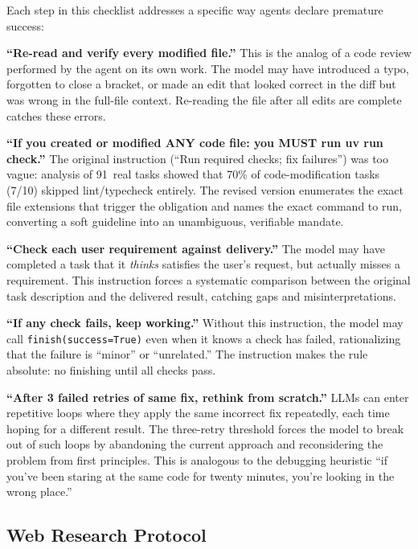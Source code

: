 \documentclass{article}
\begin{document}
\noindent Each step in this checklist addresses a specific way agents declare premature success:

\textbf{``Re-read and verify every modified file.''}  This is the analog of a code review performed by the agent on its own work.  The model may have introduced a typo, forgotten to close a bracket, or made an edit that looked correct in the diff but was wrong in the full-file context.  Re-reading the file after all edits are complete catches these errors.

\textbf{``If you created or modified ANY code file: you MUST run uv run check.''}  The original instruction (``Run required checks; fix failures'') was too vague: analysis of 91~real tasks showed that 70\% of code-modification tasks (7/10) skipped lint/typecheck entirely.  The revised version enumerates the exact file extensions that trigger the obligation and names the exact command to run, converting a soft guideline into an unambiguous, verifiable mandate.

\textbf{``Check each user requirement against delivery.''}  The model may have completed a task that it \emph{thinks} satisfies the user's request, but actually misses a requirement.  This instruction forces a systematic comparison between the original task description and the delivered result, catching gaps and misinterpretations.

\textbf{``If any check fails, keep working.''}  Without this instruction, the model may call \texttt{finish(success=True)} even when it knows a check has failed, rationalizing that the failure is ``minor'' or ``unrelated.''  The instruction makes the rule absolute: no finishing until all checks pass.

\textbf{``After 3 failed retries of same fix, rethink from scratch.''}  LLMs can enter repetitive loops where they apply the same incorrect fix repeatedly, each time hoping for a different result.  The three-retry threshold forces the model to break out of such loops by abandoning the current approach and reconsidering the problem from first principles.  This is analogous to the debugging heuristic ``if you've been staring at the same code for twenty minutes, you're looking in the wrong place.''

\subsection{Web Research Protocol}
\end{document}
